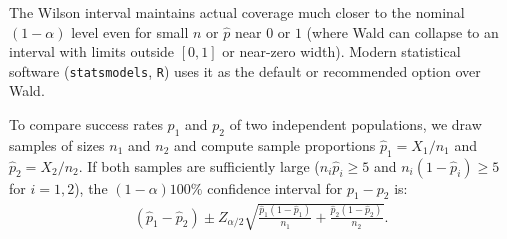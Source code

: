 \begin{observacion}
	The Wilson interval maintains actual coverage much closer to the nominal $(1-\alpha)$ level even for small $n$ or $\hat p$ near $0$ or $1$ (where Wald can collapse to an interval with limits outside $[0,1]$ or near-zero width). Modern statistical software (\texttt{statsmodels}, \texttt{R}) uses it as the default or recommended option over Wald.
\end{observacion}

\begin{teorema}
	To compare success rates $p_1$ and $p_2$ of two independent populations, we draw samples of sizes $n_1$ and $n_2$ and compute sample proportions $\hat{p}_1 = X_1/n_1$ and $\hat{p}_2 = X_2/n_2$. If both samples are sufficiently large ($n_i\hat{p}_i \geq 5$ and $n_i(1-\hat{p}_i) \geq 5$ for $i=1,2$), the $(1-\alpha)100\%$ confidence interval for $p_1 - p_2$ is:
	\begin{align}
		(\hat{p}_1 - \hat{p}_2) \pm Z_{\alpha/2} \sqrt{\frac{\hat{p}_1(1-\hat{p}_1)}{n_1} + \frac{\hat{p}_2(1-\hat{p}_2)}{n_2}}.
	\end{align}
\end{teorema}
